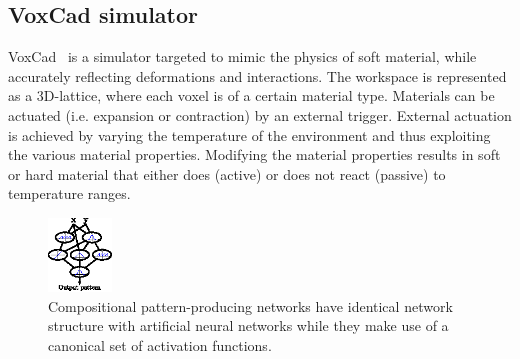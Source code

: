 \documentclass{sig-alternate}
\begin{document}
\newpage
\subsection{VoxCad simulator}
VoxCad~\cite{hiller2012dynamic} is a simulator targeted to mimic the physics of soft material, while accurately reflecting deformations and interactions. The workspace is represented as a 3D-lattice, where each voxel is of a certain material type. Materials can be actuated (i.e. expansion or contraction) by an external trigger. External actuation is achieved by varying the temperature of the environment and thus exploiting the various material properties. Modifying the material properties results in soft or hard material that either does (active) or does not  react (passive) to temperature ranges.

\begin{figure}[t!]
\centering
\includegraphics[width=0.15\textwidth]{../Figures/Misc/cppnNetwork.eps}
\caption{Compositional pattern-producing networks have identical network structure with artificial neural networks while they make use of a canonical set of activation functions.}
\label{fig:cppnNetwork}
\end{figure}
\end{document}
